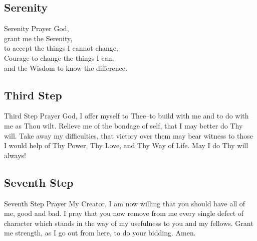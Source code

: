 \documentclass{beamer}
\begin{document}
    \subsection{Serenity}
        \begin{frame}[plain]\LARGE
        \begin{alertblock}{Serenity Prayer}
God, \\grant me the Serenity,\\ to accept the things I cannot change,\\ Courage to change the things I can, \\and the Wisdom to know the difference.
\end{alertblock}
    \end{frame}
    
    \subsection{Third Step}
            \begin{frame}[plain]\LARGE
        \begin{alertblock}{Third Step Prayer}
God, I offer myself to Thee--to build with me and to do with me as Thou wilt. Relieve me of the bondage of self, that I may better do Thy will. Take away my difficulties, that victory over them may bear witness to those I would help of Thy Power, Thy Love, and Thy Way of Life.  May I do Thy will always!
\end{alertblock}
    \end{frame}
    
    \subsection{Seventh Step}
                \begin{frame}[plain]\LARGE
        \begin{alertblock}{Seventh Step Prayer}
My Creator, I am now willing that you should have all of me, good and bad. I pray that you now remove from me every single defect of character which stands in the way of my usefulness to you and my fellows. Grant me strength, as I go out from here, to do your bidding.  Amen.
\end{alertblock}
    \end{frame}
    
\end{document}
